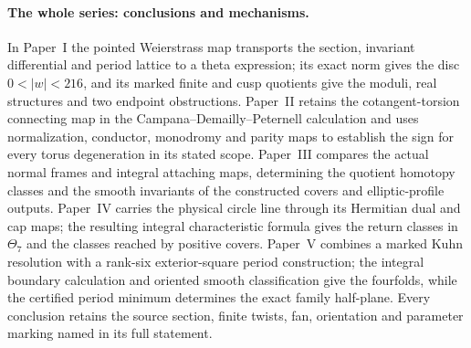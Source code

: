 \paragraph{The whole series: conclusions and mechanisms.}
In Paper~I the pointed Weierstrass map transports the section,
invariant differential and period lattice to a theta expression;
its exact norm gives the disc $0<|w|<216$, and its marked finite
and cusp quotients give the moduli, real structures and two endpoint
obstructions. Paper~II retains the cotangent-torsion connecting map
in the Campana--Demailly--Peternell calculation and uses normalization,
conductor, monodromy and parity maps to establish the sign for every
torus degeneration in its stated scope. Paper~III compares the actual
normal frames and integral attaching maps, determining the quotient
homotopy classes and the smooth invariants of the constructed covers
and elliptic-profile outputs. Paper~IV carries the physical circle
line through its Hermitian dual and cap maps; the resulting integral
characteristic formula gives the return classes in $\Theta_7$ and
the classes reached by positive covers. Paper~V combines a marked
Kuhn resolution with a rank-six exterior-square period construction;
the integral boundary calculation and oriented smooth classification
give the fourfolds, while the certified period minimum determines
the exact family half-plane. Every conclusion retains the source
section, finite twists, fan, orientation and parameter marking named
in its full statement.
